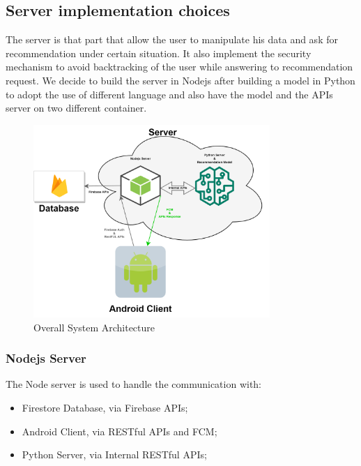 \documentclass[../../main]{subfiles}
\begin{document}
\subsection{Server implementation choices}
\label{ss:server-implementation-choices}

The server is that part that allow the user to manipulate his data and ask for recommendation under certain situation.
It also implement the security mechanism to avoid backtracking of the user while answering to recommendation request.
We decide to build the server in Nodejs after building a model in Python to adopt the use of different language and also
have the model and the APIs server on two different container. 

\begin{figure}[h]
    \centering
    \includegraphics[width=0.8\textwidth]{images/system_architecture}
    \caption{Overall System Architecture}\label{fig:system_architecture}
\end{figure}

\subsubsection{Nodejs Server}
The Node server is used to handle the communication with:
\begin{itemize}
    \item Firestore Database, via Firebase APIs;
    \item Android Client, via RESTful APIs and FCM;
    \item Python Server, via Internal RESTful APIs;
\end{itemize}
\end{document}
